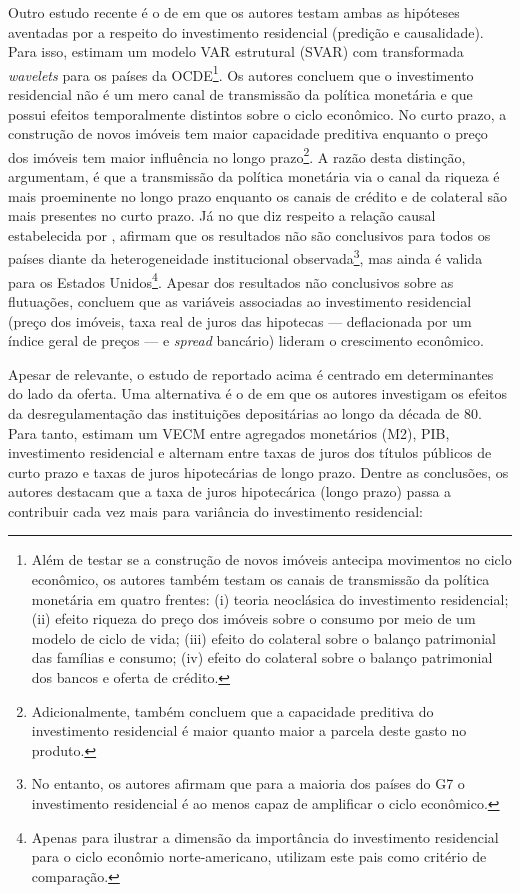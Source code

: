 Outro estudo recente é o de \textcite{huang_is_2018} em que os autores testam ambas as hipóteses aventadas por \textcite{leamer_housing_2007} a respeito do investimento residencial (predição e causalidade). Para isso, estimam um modelo VAR estrutural (SVAR) com transformada \textit{wavelets} para os países da OCDE\footnote{
	Além de testar se a construção de novos imóveis antecipa movimentos no ciclo econômico, os autores também testam os canais de transmissão da política monetária em quatro frentes: (i) teoria neoclásica do investimento residencial; (ii) efeito riqueza do preço dos imóveis sobre o consumo por meio de um modelo de ciclo de vida; (iii) efeito do colateral sobre o balanço patrimonial das famílias e consumo; (iv) efeito do colateral sobre o balanço patrimonial dos bancos e oferta de crédito.}.  
Os autores concluem que o investimento residencial não é um mero canal de transmissão da política monetária e que possui efeitos temporalmente distintos sobre o ciclo econômico. No curto prazo, a construção de novos imóveis tem maior capacidade preditiva enquanto o preço dos imóveis tem maior influência no longo prazo\footnote{Adicionalmente, \textcite{huang_is_2018} também concluem que a capacidade preditiva do investimento residencial é maior quanto maior a parcela deste gasto no produto.}. A razão desta distinção, argumentam, é que a transmissão da política monetária via o canal da riqueza é mais proeminente no longo prazo enquanto os canais de crédito e de colateral são mais presentes no curto prazo. Já no que diz respeito a relação causal estabelecida por \textcite{leamer_housing_2007}, afirmam que os resultados não são conclusivos para todos os países diante da heterogeneidade institucional observada\footnote{
	No entanto, os autores afirmam que para a maioria dos países do G7 o investimento residencial é ao menos capaz de amplificar o ciclo econômico.}, mas ainda é valida para os Estados Unidos\footnote{
	Apenas para ilustrar a dimensão da importância do investimento residencial para o ciclo econômio norte-americano, \textcite{huang_is_2018} utilizam este pais como critério de comparação.}.
Apesar dos resultados não conclusivos sobre as flutuações, concluem que as variáveis associadas ao investimento residencial (preço dos imóveis, taxa real de juros das hipotecas --- deflacionada por um índice geral de preços --- e \textit{spread} bancário) lideram o crescimento econômico.

Apesar de relevante, o estudo  de \textcite{huang_is_2018} reportado acima é centrado em determinantes do lado da oferta.
Uma alternativa é o de \textcite{gauger_residential_2003} em que os autores investigam os efeitos da desregulamentação das instituições depositárias ao longo da década de 80. Para tanto, estimam um VECM entre agregados monetários (M2), PIB, investimento residencial e alternam entre taxas de juros dos títulos públicos  de curto prazo e taxas de juros hipotecárias de longo prazo.
Dentre as conclusões, os autores destacam que a taxa de juros hipotecárica (longo prazo) passa a contribuir cada vez mais para variância do investimento residencial:

